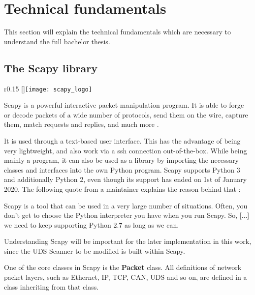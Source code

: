 \section{Technical fundamentals}

This section will explain the technical fundamentals which are necessary to understand the full bachelor thesis.

\subsection{The Scapy library}
\label{sec:scapy}

\begin{wrapfigure}{r}{0.15\textwidth}
    \raisebox{0pt}[\dimexpr{}\baselineskip\relax]{\texttt{[image: scapy\_logo]}}
\end{wrapfigure}

Scapy is a powerful interactive packet manipulation program. It is able to forge or decode packets of a wide number of protocols, send them on the wire, capture them, match requests and replies, and much more \cite{scapy}.

It is used through a text-based user interface. This has the advantage of being very lightweight, and also work via a ssh connection out-of-the-box. While being mainly a program, it can also be used as a library by importing the necessary classes and interfaces into the own Python program. Scapy supports Python 3 and additionally Python 2, even though its support has ended on 1st of January 2020. The following quote from a maintainer explains the reason behind that \cite{scapy-py2}:

\begin{displayquote}
    Scapy is a tool that can be used in a very large number of situations. Often, you don't get to choose the Python interpreter you have when you run Scapy. So, [...] we need to keep supporting Python 2.7 as long as we can.
\end{displayquote}

Understanding Scapy will be important for the later implementation in this work, since the UDS Scanner to be modified is built within Scapy.

One of the core classes in Scapy is the \textbf{Packet} class. All definitions of network packet layers, such as Ethernet, IP, TCP, CAN, UDS and so on, are defined in a class inheriting from that class.

